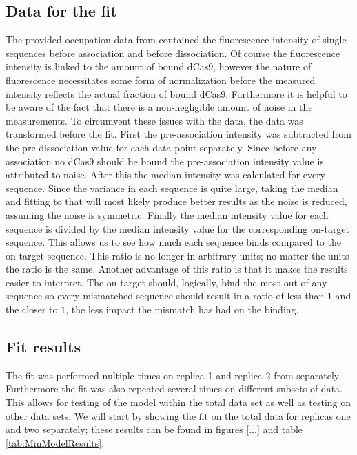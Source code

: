 \subsection{Data for the fit}
The provided occupation data from \cite{PNAS} contained the fluorescence intensity of single sequences before association and before dissociation. Of course the fluorescence intensity is linked to the amount of bound dCas9, however the nature of fluorescence necessitates some form of normalization before the measured intensity reflects the actual fraction of bound dCas9. Furthermore it is helpful to be aware of the fact that there is a non-negligible amount of noise in the measurements. %
To circumvent these issues with the data, the data was transformed before the fit. First the pre-association intensity was subtracted from the pre-dissociation value for each data point separately. Since before any association no dCas9 should be bound the pre-association intensity value is attributed to noise. After this the median intensity was calculated for every sequence. Since the variance in each sequence is quite large, taking the median and fitting to that will most likely produce better results as the noise is reduced, assuming the noise is symmetric. Finally the median intensity value for each sequence is divided by the median intensity value for the corresponding on-target sequence. This allows us to see how much each sequence binds compared to the on-target sequence. This ratio is no longer in arbitrary units; no matter the units the ratio is the same. Another advantage of this ratio is that it makes the results easier to interpret. The on-target should, logically, bind the most out of any sequence so every mismatched sequence should result in a ratio of less than $1$ and the closer to $1$, the less impact the mismatch has had on the binding.


\subsection{Fit results}
\label{sec:minmodelresults}


The fit was performed nultiple times on replica 1 and replica 2 from \cite{PNAS} separately. Furthermore the fit was also repeated several times on different subsets of data. This allows for testing of the model within the total data set as well as testing on other data sets. We will start by showing the fit on the total data for replicas one and two separately; these results can be found in figures \ref{...} and table \ref{tab:MinModelResults}. %



